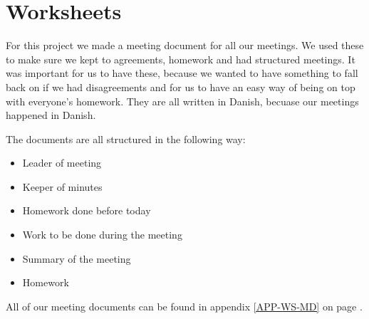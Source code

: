 \chapter{Worksheets}
For this project we made a meeting document for all our meetings. We used
these to make sure we kept to agreements, homework and had structured meetings. It
was important for us to have these, because we wanted to have something to fall
back on if we had disagreements and for us to have an easy way of being on top
with everyone's homework. They are all written in Danish, becuase our meetings
happened in Danish.

The documents are all structured in the following way: 
\begin{itemize}
  \item Leader of meeting
  \item Keeper of minutes
  \item Homework done before today
  \item Work to be done during the meeting
  \item Summary of the meeting
  \item Homework
\end{itemize}

All of our meeting documents can be found in appendix \ref{APP-WS-MD} on page
\pageref{APP-WS-MD}.

